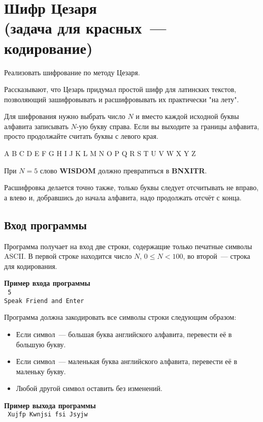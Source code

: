 \documentclass[a4paper,10pt]{article}
\begin{document}
\section*{Шифр Цезаря\\
(задача для красных~--- кодирование)}

Реализовать шифрование по методу Цезаря.

Рассказывают, что Цезарь придумал простой шифр для латинских текстов, позволяющий зашифровывать и расшифровывать их практически "на лету".

Для шифрования нужно выбрать число $N$ и вместо каждой исходной буквы алфавита записывать $N$-ую букву справа.
Если вы выходите за границы алфавита, просто продолжайте считать буквы с левого края.

\begin{center}
A B C D E F G H I J K L M N O P Q R S T U V W X Y Z
\end{center}

При $N = 5$ слово \textbf{WISDOM} должно превратиться в \textbf{BNXITR}.

Расшифровка делается точно также, только буквы следует отсчитывать не вправо, а влево и, добравшись до начала алфавита, надо продолжать отсчёт с конца.

\subsection*{Вход программы}

Программа получает на вход две строки, содержащие только печатные символы ASCII.
В первой строке находится число $N$, $0 \leq N < 100$, во второй~--- строка для кодирования.

\noindent\textbf{Пример входа программы}\\
\texttt{
5\\
Speak Friend and Enter
}

Программа должна закодировать все символы строки следующим образом:

\begin{itemize}
    \item Если символ~--- большая буква английского алфавита, перевести её в большую букву.
    \item Если символ~--- маленькая буква английского алфавита, перевести её в маленьку букву.
    \item Любой другой символ оставить без изменений.
\end{itemize}

\noindent\textbf{Пример выхода программы}\\
\texttt{
Xujfp Kwnjsi fsi Jsyjw
}
\end{document}
